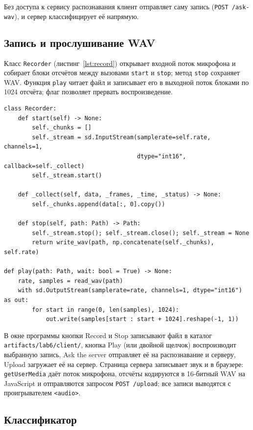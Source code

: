 \documentclass[14pt,a4paper]{extarticle}
\begin{document}
Без доступа к сервису распознавания клиент отправляет саму запись
(\texttt{POST /ask-wav}), и сервер классифицирует её напрямую.

\subsection{Запись и прослушивание WAV}

Класс \texttt{Recorder} (листинг~\ref{lst:record}) открывает входной поток микрофона и
собирает блоки отсчётов между вызовами \texttt{start} и \texttt{stop}; метод
\texttt{stop} сохраняет WAV. Функция \texttt{play} читает файл и записывает его в
выходной поток блоками по 1024 отсчёта; флаг позволяет прервать воспроизведение.

\begin{lstlisting}[style=python, caption={Запись и воспроизведение (lab6/voice.py)}, label={lst:record}]
class Recorder:
    def start(self) -> None:
        self._chunks = []
        self._stream = sd.InputStream(samplerate=self.rate, channels=1,
                                      dtype="int16", callback=self._collect)
        self._stream.start()

    def _collect(self, data, _frames, _time, _status) -> None:
        self._chunks.append(data[:, 0].copy())

    def stop(self, path: Path) -> Path:
        self._stream.stop(); self._stream.close(); self._stream = None
        return write_wav(path, np.concatenate(self._chunks), self.rate)

def play(path: Path, wait: bool = True) -> None:
    rate, samples = read_wav(path)
    with sd.OutputStream(samplerate=rate, channels=1, dtype="int16") as out:
        for start in range(0, len(samples), 1024):
            out.write(samples[start : start + 1024].reshape(-1, 1))
\end{lstlisting}

В окне программы кнопки Record и Stop записывают файл в каталог
\texttt{artifacts/lab6/client/}, кнопка Play (или двойной щелчок) воспроизводит
выбранную запись, Ask the server отправляет её на распознавание и серверу, Upload
загружает её на сервер. Страница сервера записывает звук и в браузере:
\texttt{getUserMedia} даёт поток микрофона, отсчёты кодируются в 16-битный WAV на
JavaScript и отправляются запросом \texttt{POST /upload}; все записи выводятся с
проигрывателем \texttt{<audio>}.

\subsection{Классификатор}
\label{sec:classifier}
\end{document}
